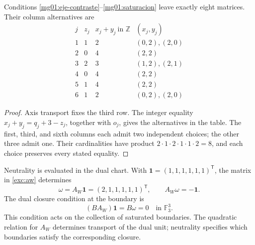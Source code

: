 \begin{proposition}
\label{mg01:ocho}
Conditions \eqref{mg01:eje-contraste}--\eqref{mg01:saturacion}
leave exactly eight matrices. Their column alternatives are
\begin{equation}
\begin{array}{c|c|c|c}
 j&z_j&x_j+y_j\ \text{in }\mathbb Z&(x_j,y_j)\\\hline
 1&1&2&(0,2),(2,0)\\
 2&0&4&(2,2)\\
 3&2&3&(1,2),(2,1)\\
 4&0&4&(2,2)\\
 5&1&4&(2,2)\\
 6&1&2&(0,2),(2,0)
\end{array}
\label{mg01:tabla-columnas}
\end{equation}
\end{proposition}
\begin{proof}
Axis transport fixes the third row. The integer equality
\(x_j+y_j=q_j+3-z_j\), together with \(o_j\), gives the alternatives
in the table. The first, third, and sixth columns each admit two
independent choices; the other three admit one. Their cardinalities
have product \(2\cdot1\cdot2\cdot1\cdot1\cdot2=8\), and each
choice preserves every stated equality.
\end{proof}

Neutrality is evaluated in the dual chart. With
\(\mathbf1=(1,1,1,1,1,1)^{\mathsf T}\), the matrix in
\eqref{exc:aw} determines
\begin{equation}
 \omega=A_W\mathbf1=(2,1,1,1,1,1)^{\mathsf T},
 \qquad A_W\omega=-\mathbf1.
 \label{mg01:unidad-dual}
\end{equation}
The dual closure condition at the boundary is
\begin{equation}
 (BA_W)\mathbf1=B\omega=0\quad\text{in }\mathbb F_3^3.
 \label{mg01:neutralidad}
\end{equation}
This condition acts on the collection of saturated boundaries. The quadratic
relation for \(A_W\) determines transport of the dual unit; neutrality
specifies which boundaries satisfy the corresponding closure.

